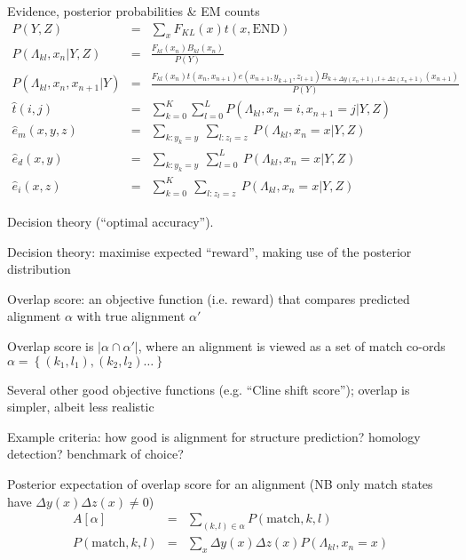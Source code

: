 \documentclass{beamer}
\begin{document}
\begin{frame}{}

\tiny
Evidence, posterior probabilities \& EM counts
\begin{eqnarray*}
P(Y,Z) & = & \sum_x F_{KL}(x) t(x,\mbox{END}) \\
P(\Lambda_{kl},x_n|Y,Z) & = & \frac{F_{kl}(x_n) B_{kl}(x_n)}{P(Y)} \\
P(\Lambda_{kl},x_n,x_{n+1}|Y) & = & \frac{F_{kl}(x_n) t(x_n,x_{n+1}) e(x_{n+1},y_{k+1},z_{l+1})
B_{k+\Delta y(x_n+1),l+\Delta z(x_n+1)}(x_{n+1})}{P(Y)} \\
\hat{t}(i,j) & = & \sum_{k=0}^K \sum_{l=0}^L P(\Lambda_{kl},x_n=i,x_{n+1}=j|Y,Z) \\
\hat{e}_m(x,y,z) & = & \sum_{k:y_k=y}\ \sum_{l:z_l=z}\ P(\Lambda_{kl},x_n=x|Y,Z) \\
\hat{e}_d(x,y) & = & \sum_{k:y_k=y}\ \sum_{l=0}^L\ P(\Lambda_{kl},x_n=x|Y,Z) \\
\hat{e}_i(x,z) & = & \sum_{k=0}^K\ \sum_{l:z_l=z}\ P(\Lambda_{kl},x_n=x|Y,Z)
\end{eqnarray*}

\end{frame}

\begin{frame}{}

Decision theory (``optimal accuracy'').
 \itemb
 \item Decision theory: maximise expected ``reward'', making use of the posterior distribution
 \item Overlap score: an objective function (i.e. reward) that compares predicted alignment $\alpha$ with true alignment $\alpha'$
  \itemb
  \item Overlap score is $|\alpha \cap \alpha'|$, where an alignment is viewed as a set of match co-ords $\alpha = \left\{ (k_1,l_1), (k_2,l_2) \ldots \right\}$
  \item Several other good objective functions (e.g. ``Cline shift score''); overlap is simpler, albeit less realistic
  \item Example criteria: how good is alignment for structure prediction? homology detection? benchmark of choice?
  \iteme
\iteme
\end{frame}

\begin{frame}{}
\itemb
 \item Posterior expectation of overlap score for an alignment (NB only match states have $\Delta y(x) \Delta z(x) \neq 0$)
\begin{eqnarray*}
A[\alpha] & = & \sum_{(k,l) \in \alpha} P(\mbox{match},k,l) \\
P(\mbox{match},k,l) & = & \sum_x \Delta y(x) \Delta z(x) P(\Lambda_{kl},x_n=x)
\end{eqnarray*}
\iteme
\end{frame}
\end{document}
